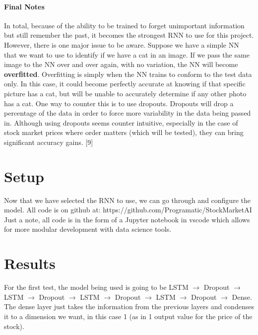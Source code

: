 \documentclass[12pt]{article}
\begin{document}
\paragraph{Final Notes}
In total, because of the ability to be trained to forget unimportant information but still remember the past, it becomes the strongest RNN to use for this project. However, there is one major issue to be aware. Suppose we have a simple NN that we want to use to identify if we have a cat in an image. If we pass the same image to the NN over and over again, with no variation, the NN will become \textbf{overfitted}. Overfitting is simply when the NN trains to conform to the test data only. In this case, it could become perfectly accurate at knowing if that specific picture has a cat, but will be unable to accurately determine if any other photo has a cat. One way to counter this is to use dropouts. Dropouts will drop a percentage of the data in order to force more variability in the data being passed in. Although using dropouts seems counter intuitive, especially in the case of stock market prices where order matters (which will be tested), they can bring significant accuracy gains. [9]  \nocite{yadav_2019}

\section{Setup}
Now that we have selected the RNN to use, we can go through and configure the model. All code is on github at: https://github.com/Programatic/StockMarketAI
Just a note, all code is in the form of a Jupyter notebook in vscode which allows for more modular development with data science tools. \\

\section{Results}
For the first test, the model being used is going to be LSTM $\rightarrow$ Dropout $\rightarrow$ LSTM $\rightarrow$ Dropout $\rightarrow$ LSTM $\rightarrow$ Dropout $\rightarrow$ LSTM $\rightarrow$ Dropout $\rightarrow$ Dense. The dense layer just takes the information from the previous layers and condenses it to a dimension we want, in this case 1 (as in 1 output value for the price of the stock). \\
\end{document}
